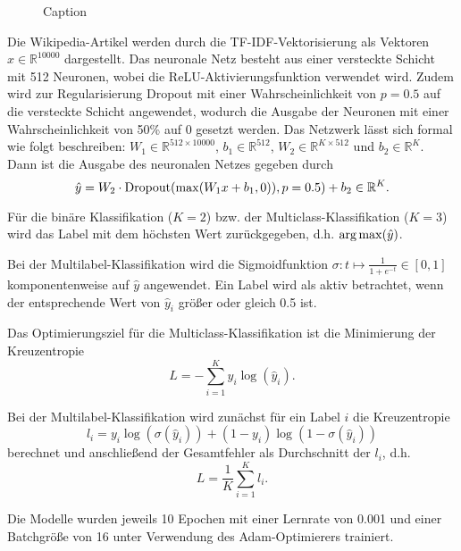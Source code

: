\begin{figure}[H]
    \centering
    
    \caption{Caption}
\end{figure}
Die Wikipedia-Artikel werden durch die TF-IDF-Vektorisierung als Vektoren $x\in\mathbb{R}^{10000}$ dargestellt. Das neuronale Netz besteht aus einer versteckte Schicht mit 512 Neuronen, wobei die ReLU-Aktivierungsfunktion verwendet wird. Zudem wird zur Regularisierung Dropout mit einer Wahrscheinlichkeit von $p=0.5$ auf die versteckte Schicht angewendet, wodurch die Ausgabe der Neuronen mit einer Wahrscheinlichkeit von 50\% auf 0 gesetzt werden. Das Netzwerk lässt sich formal wie folgt beschreiben: $W_1\in\mathbb{R}^{512\times 10000}$, $b_1\in\mathbb{R}^{512}$, $W_2\in\mathbb{R}^{K\times 512}$ und $b_2\in\mathbb{R}^{K}$. Dann ist die Ausgabe des neuronalen Netzes gegeben durch
\begin{equation*}
    \hat{y} = W_2\cdot \operatorname*{Dropout}(\max(W_1x + b_1, 0)), p=0.5) + b_2\in\mathbb{R}^{K}.
\end{equation*}

Für die binäre Klassifikation ($K=2$) bzw. der Multiclass-Klassifikation ($K=3$) wird das Label mit dem höchsten Wert zurückgegeben, d.h. $\operatorname*{arg\,max} (\hat{y})$.

Bei der Multilabel-Klassifikation wird die Sigmoidfunktion $\sigma\colon t\mapsto \frac{1}{1 + e^{-t}}\in [0, 1]$ komponentenweise auf $\hat{y}$ angewendet. Ein Label wird als aktiv betrachtet, wenn der entsprechende Wert von $\hat{y}_i$ größer oder gleich 0.5 ist.

Das Optimierungsziel für die Multiclass-Klassifikation ist die Minimierung der Kreuzentropie
\begin{equation*}
    L = - \sum_{i=1}^{K}y_i\log(\hat{y}_i).
\end{equation*}

Bei der Multilabel-Klassifikation wird zunächst für ein Label $i$ die Kreuzentropie
\begin{equation*}
    l_i = y_i\log (\sigma(\hat{y}_i)) + (1 - y_i)\log (1 - \sigma(\hat{y}_i))
\end{equation*}
berechnet und anschließend der Gesamtfehler als Durchschnitt der $l_i$, d.h.
\begin{equation*}
    L = \frac{1}{K}\sum_{i=1}^{K} l_i.
\end{equation*}

Die Modelle wurden jeweils 10 Epochen mit einer Lernrate von 0.001 und einer Batchgröße von 16 unter Verwendung des Adam-Optimierers trainiert.